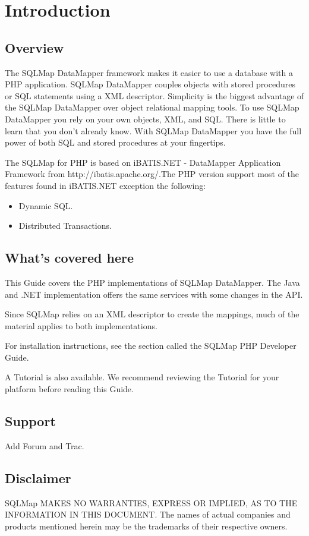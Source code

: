 \chapter{Introduction}

\section{Overview}

The SQLMap DataMapper framework makes it easier to use a database with a PHP
application. SQLMap DataMapper couples objects with stored procedures or SQL
statements using a XML descriptor. Simplicity is the biggest advantage of the
SQLMap DataMapper over object relational mapping tools. To use SQLMap
DataMapper you rely on your own objects, XML, and SQL. There is little to
learn that you don't already know. With SQLMap DataMapper you have the full
power of both SQL and stored procedures at your fingertips.

The SQLMap for PHP is based on iBATIS.NET - DataMapper Application Framework
from http://ibatis.apache.org/.The PHP version support most of the features
found in iBATIS.NET exception the following:

\begin{itemize}
  \item Dynamic SQL.
  \item Distributed Transactions.
\end{itemize}

\section{What's covered here}

This Guide covers the PHP implementations of SQLMap DataMapper. The Java and
.NET implementation offers the same services with some changes in the API.

Since SQLMap relies on an XML descriptor to create the mappings, much of the
material applies to both implementations.

For installation instructions, see the section called the SQLMap PHP Developer
Guide.

A Tutorial is also available. We recommend reviewing the Tutorial for your
platform before reading this Guide.

\section{Support}

Add Forum and Trac.

\section{Disclaimer}
SQLMap MAKES NO WARRANTIES, EXPRESS OR IMPLIED, AS TO THE INFORMATION IN THIS
DOCUMENT. The names of actual companies and products mentioned herein may be
the trademarks of their respective owners.
